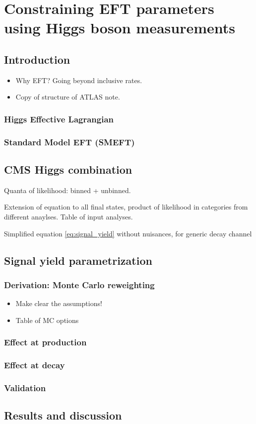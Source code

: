 \chapter{Constraining EFT parameters using Higgs boson measurements}
\label{chap:eft}

\section{Introduction}
\begin{itemize}
    \item Why EFT? Going beyond inclusive rates.
    \item Copy of structure of ATLAS note.
\end{itemize}

\subsection{Higgs Effective Lagrangian}

\subsection{Standard Model EFT (SMEFT)}

\section{CMS Higgs combination}

Quanta of likelihood: binned + unbinned. 

Extension of equation to all final states, product of likelihood in categories from different anaylses. Table of input analyses.

Simplified equation \ref{eq:signal_yield} without nuisances, for generic decay channel


\section{Signal yield parametrization}

\subsection{Derivation: Monte Carlo reweighting}
\begin{itemize}
    \item Make clear the assumptions!
    \item Table of MC options
\end{itemize}
\subsection{Effect at production}

\subsection{Effect at decay}

\subsection{Validation}

\section{Results and discussion}
